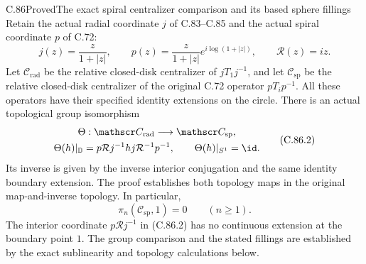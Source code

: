 \begin{claim}{C.86}{Proved}{The exact spiral centralizer comparison and its based sphere fillings}
Retain the actual radial coordinate $j$ of C.83--C.85
and the actual spiral coordinate $p$ of C.72:
\[
 j(z)=\frac{z}{1+|z|},\qquad
 p(z)=\frac{z}{1+|z|}e^{i\log(1+|z|)},\qquad
 \mathcal R(z)=iz.
                                                               \tag{C.86.1}
\]
Let $\mathscr C_{\mathrm{rad}}$ be the relative
closed-disk centralizer of $jT_1j^{-1}$, and let
$\mathscr C_{\mathrm{sp}}$ be the relative
closed-disk centralizer of the original C.72
operator $pT_i p^{-1}$. All these operators have
their specified identity extensions on the circle.
There is an actual topological group isomorphism
\[
 \begin{gathered}
 \Theta:\mathscr C_{\mathrm{rad}}
                \longrightarrow\mathscr C_{\mathrm{sp}},\\
 \Theta(h)|_{\mathbb D}
       =p\mathcal Rj^{-1}h j\mathcal R^{-1}p^{-1},
       \qquad \Theta(h)|_{S^1}=\id.
 \end{gathered}                                                   \tag{C.86.2}
\]
Its inverse is given by the inverse interior
conjugation and the same identity boundary
extension. The proof establishes both topology
maps in the original map-and-inverse topology.
In particular,
\[
             \pi_n(\mathscr C_{\mathrm{sp}},1)=0
                          \qquad(n\geq1).                        \tag{C.86.3}
\]
The interior coordinate
$p\mathcal Rj^{-1}$ in (C.86.2) has no
continuous extension at the boundary point
$1$. The group comparison and the stated
fillings are established by the exact
sublinearity and topology calculations below.
\end{claim}

